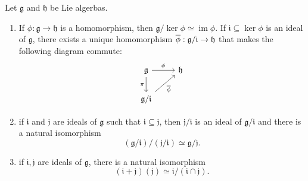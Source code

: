 \documentclass{article}
\DeclareMathOperator{\im}{im}
\newcommand{\frkg}{\ensuremath{\mathfrak{g}}}
\newcommand{\frkh}{\ensuremath{\mathfrak{h}}}
\newcommand{\frki}{\ensuremath{\mathfrak{i}}}
\newcommand{\frkj}{\ensuremath{\mathfrak{j}}}
\begin{document}
\begin{theorem}
    Let $\frkg$ and $\frkh$ be Lie algerbas.
    \begin{enumerate}[label=(\alph*)]
        \item 
            If $\phi: \frkg \to \frkh$ is a homomorphism, then $\frkg / \ker \phi \simeq \im \phi$.
            If $\frki \subseteq \ker \phi$ is an ideal of $\frkg$, there exists a unique homomorphism $\barphi: \frkg/\frki \to \frkh$ that makes the following diagram commute:
            \[
                \begin{tikzcd}
                    \frkg \arrow[r, "\phi"] \arrow[d, "\pi"'] & \frkh \\ 
                                                             \frkg/\frki \arrow[ur, "\barphi"']
                \end{tikzcd}
            \]
        \item 
            if $\frki$ and $\frkj$ are ideals of $\frkg$ such that $\frki \subseteq \frkj$, then $\frkj/\frki$ is an ideal of $\frkg/\frki$ and there is a natural isomorphism
            \[
                (\frkg/\frki)/(\frkj/\frki)
                \simeq
                \frkg/\frkj.
            \]
        \item 
            if $\frki, \frkj$ are ideals of $\frkg$, there is a natural isomorphism
            \[
                (\frki + \frkj)(\frkj)
                \simeq
                \frki/(\frki \cap \frkj).
            \]
    \end{enumerate}
\end{theorem}
\end{document}
